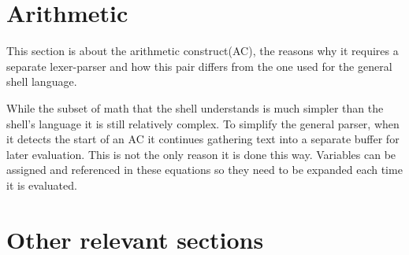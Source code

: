 \section{Arithmetic}
This section is about the arithmetic construct(AC), the reasons why it requires a separate lexer-parser and how this pair differs from the one used for the general shell language.

While the subset of math that the shell understands is much simpler than the shell's language it is still relatively complex. 
To simplify the general parser, when it detects the start of an AC it continues gathering text into a separate buffer for later evaluation.
This is not the only reason it is done this way.
Variables can be assigned and referenced in these equations so they need to be expanded each time it is evaluated.




















\section{Other relevant sections}